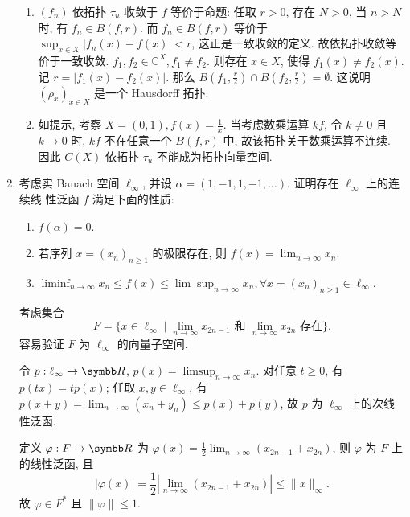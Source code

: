 \begin{enumerate}
\begin{answer}
\begin{enumerate}
        \item $\left(f_{n}\right)$ 依拓扑 $\tau_{u}$ 收敛于 $f$ 等价于命题: 
        任取 $r>0$, 存在 $N>0$, 当 $n>N$ 时, 有 $f_{n} \in B(f,r)$. 
        而 $f_{n}\in B(f, r)$ 等价于 $\sup_{x \in X}\left|f_{n}(x)-f(x)\right|<r$, 这正是一致收敛的定义. 故依拓扑收敛等价于一致收敛.
        $f_1,f_2\in\mathbb{C}^{X}, f_1\neq f_2$. 则存在 $x \in X$, 
        使得 $f_1(x)\neq f_2(x)$. 记 $r=\left|f_{1}(x)-f_{2}(x)\right|$. 
        那么 $B\left(f_{1}, \frac{r}{2}\right) \cap B\left(f_{2}, \frac{r}{2}\right)=\emptyset$. 
        这说明 $\left(\rho_{x}\right)_{x \in X}$ 是一个 Hausdorff 拓扑.
    
        \item 如提示, 考察 $X=(0,1), f(x)=\frac{1}{x}$. 当考虑数乘运算 $kf$, 
        令 $k\neq 0$ 且 $k \rightarrow 0$ 时, $kf$ 不在任意一个 $B(f, r)$ 中, 
        故该拓扑关于数乘运算不连续. 因此 $C(X)$ 依拓扑 $\tau_{u}$ 不能成为拓扑向量空间.
      \end{enumerate}
    \end{answer}
  \item 考虑实 Banach 空间 $\ell_{\infty}$, 并设 $\alpha=(1,-1,1,-1, \ldots)$. 证明存在 $\ell_{\infty}$ 上的连续线 性泛函 $f$ 满足下面的性质:
    \begin{enumerate}
      \item $f(\alpha)=0$.
      \item 若序列 $x=\left(x_{n}\right)_{n \geq 1}$ 的极限存在, 则 $f(x)=\lim _{n \rightarrow \infty} x_{n}$.
      \item $\liminf _{n \rightarrow \infty} x_{n} \leq f(x) \leq \lim \sup _{n \rightarrow \infty} x_{n}, \forall x=\left(x_{n}\right)_{n \geq 1} \in \ell_{\infty}$.
    \end{enumerate}
    \begin{answer}
      考虑集合
      \[F=\{x\in\ell_{\infty}\mid \lim_{n\to\infty}x_{2n-1}\text{\ 和\ }\lim_{n\to\infty}x_{2n}\text{\ 存在}\}.\]
      容易验证 $F$ 为 $\ell_{\infty}$ 的向量子空间.

      令 $p:\ell_{\infty}\to\R$, $p(x)=\limsup_{n\to\infty}x_n$.
      对任意 $t\geq 0$, 有 $p(tx)=tp(x)$; 任取 $x,y\in\ell_{\infty}$,
      有 $p(x+y)=\lim_{n\to\infty}(x_n+y_n)\leq p(x)+p(y)$,
      故 $p$ 为 $\ell_{\infty}$ 上的次线性泛函.

      定义 $\varphi: F\to\R$ 为 $\varphi(x)=\frac{1}{2}\lim_{n\to\infty}(x_{2n-1}+x_{2n})$,
      则 $\varphi$ 为 $F$ 上的线性泛函, 且
      \[|\varphi(x)|=\frac{1}{2}\left|\lim_{n\to\infty}(x_{2n-1}+x_{2n})\right|\leq\|x\|_{\infty}.\]
      故 $\varphi\in F^*$ 且 $\|\varphi\|\leq 1$.


\end{answer}
\end{enumerate}
